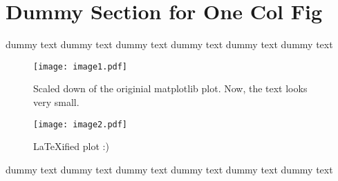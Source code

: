 \documentclass[runningheads,a4paper]{llncs}
\begin{document}
\mainmatter  %

\title{}

\author{Taygun Keke\c{c}}
%


\maketitle


\newpage

\section{Dummy Section for One Col Fig}
dummy text dummy text dummy text dummy text dummy text dummy text 
\begin{figure}
\centering \texttt{[image: image1.pdf]}
\caption{Scaled down of the originial matplotlib plot. Now, the text looks very small.}
\label{image1}
\end{figure}

\begin{figure}
\centering \texttt{[image: image2.pdf]}
\caption{LaTeXified plot :)}
\label{image2}
\end{figure}
dummy text dummy text dummy text dummy text dummy text dummy text 
\end{document}
